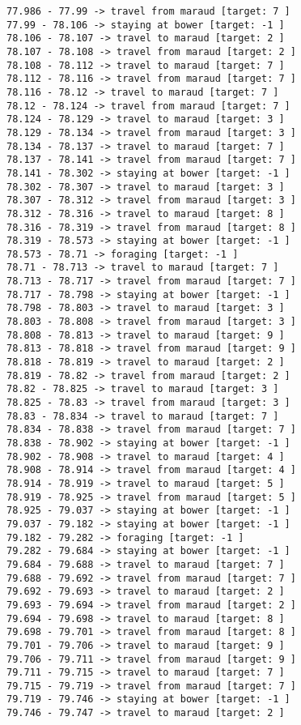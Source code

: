 \documentclass[11pt]{article}
\begin{document}
\begin{Verbatim}[commandchars=\\\{\}]
77.986 - 77.99 -> travel from maraud [target: 7 ]
77.99 - 78.106 -> staying at bower [target: -1 ]
78.106 - 78.107 -> travel to maraud [target: 2 ]
78.107 - 78.108 -> travel from maraud [target: 2 ]
78.108 - 78.112 -> travel to maraud [target: 7 ]
78.112 - 78.116 -> travel from maraud [target: 7 ]
78.116 - 78.12 -> travel to maraud [target: 7 ]
78.12 - 78.124 -> travel from maraud [target: 7 ]
78.124 - 78.129 -> travel to maraud [target: 3 ]
78.129 - 78.134 -> travel from maraud [target: 3 ]
78.134 - 78.137 -> travel to maraud [target: 7 ]
78.137 - 78.141 -> travel from maraud [target: 7 ]
78.141 - 78.302 -> staying at bower [target: -1 ]
78.302 - 78.307 -> travel to maraud [target: 3 ]
78.307 - 78.312 -> travel from maraud [target: 3 ]
78.312 - 78.316 -> travel to maraud [target: 8 ]
78.316 - 78.319 -> travel from maraud [target: 8 ]
78.319 - 78.573 -> staying at bower [target: -1 ]
78.573 - 78.71 -> foraging [target: -1 ]
78.71 - 78.713 -> travel to maraud [target: 7 ]
78.713 - 78.717 -> travel from maraud [target: 7 ]
78.717 - 78.798 -> staying at bower [target: -1 ]
78.798 - 78.803 -> travel to maraud [target: 3 ]
78.803 - 78.808 -> travel from maraud [target: 3 ]
78.808 - 78.813 -> travel to maraud [target: 9 ]
78.813 - 78.818 -> travel from maraud [target: 9 ]
78.818 - 78.819 -> travel to maraud [target: 2 ]
78.819 - 78.82 -> travel from maraud [target: 2 ]
78.82 - 78.825 -> travel to maraud [target: 3 ]
78.825 - 78.83 -> travel from maraud [target: 3 ]
78.83 - 78.834 -> travel to maraud [target: 7 ]
78.834 - 78.838 -> travel from maraud [target: 7 ]
78.838 - 78.902 -> staying at bower [target: -1 ]
78.902 - 78.908 -> travel to maraud [target: 4 ]
78.908 - 78.914 -> travel from maraud [target: 4 ]
78.914 - 78.919 -> travel to maraud [target: 5 ]
78.919 - 78.925 -> travel from maraud [target: 5 ]
78.925 - 79.037 -> staying at bower [target: -1 ]
79.037 - 79.182 -> staying at bower [target: -1 ]
79.182 - 79.282 -> foraging [target: -1 ]
79.282 - 79.684 -> staying at bower [target: -1 ]
79.684 - 79.688 -> travel to maraud [target: 7 ]
79.688 - 79.692 -> travel from maraud [target: 7 ]
79.692 - 79.693 -> travel to maraud [target: 2 ]
79.693 - 79.694 -> travel from maraud [target: 2 ]
79.694 - 79.698 -> travel to maraud [target: 8 ]
79.698 - 79.701 -> travel from maraud [target: 8 ]
79.701 - 79.706 -> travel to maraud [target: 9 ]
79.706 - 79.711 -> travel from maraud [target: 9 ]
79.711 - 79.715 -> travel to maraud [target: 7 ]
79.715 - 79.719 -> travel from maraud [target: 7 ]
79.719 - 79.746 -> staying at bower [target: -1 ]
79.746 - 79.747 -> travel to maraud [target: 2 ]

\end{Verbatim}
\end{document}
